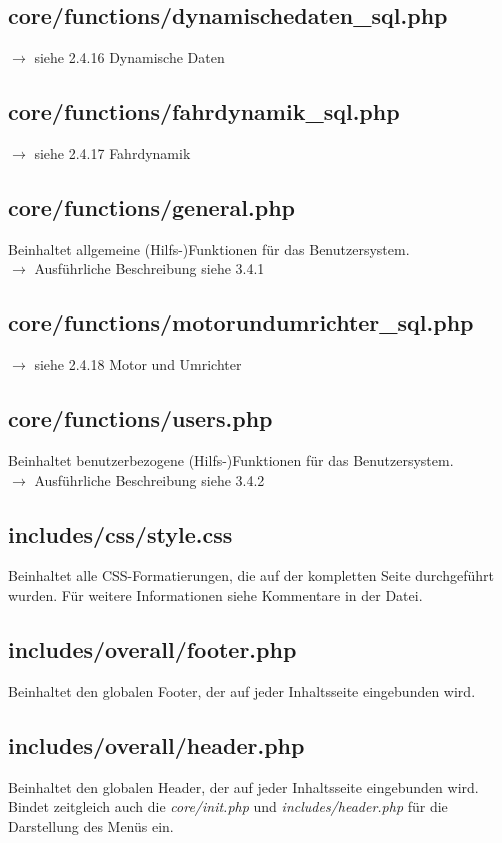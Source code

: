 \documentclass[fontsize = 12pt, paper = a4]{scrreprt}
\begin{document}
\subsection{core/functions/dynamischedaten\_sql.php}
$\rightarrow$ siehe 2.4.16 Dynamische Daten

\subsection{core/functions/fahrdynamik\_sql.php}
$\rightarrow$ siehe 2.4.17 Fahrdynamik

\subsection{core/functions/general.php}
Beinhaltet allgemeine (Hilfs-)Funktionen für das Benutzersystem.\\
$\rightarrow$ Ausführliche Beschreibung siehe 3.4.1

\subsection{core/functions/motorundumrichter\_sql.php}
$\rightarrow$ siehe 2.4.18 Motor und Umrichter

\subsection{core/functions/users.php}
Beinhaltet benutzerbezogene (Hilfs-)Funktionen für das Benutzersystem.\\
$\rightarrow$ Ausführliche Beschreibung siehe 3.4.2

\subsection{includes/css/style.css}
Beinhaltet alle CSS-Formatierungen, die auf der kompletten Seite durchgeführt wurden. Für weitere Informationen siehe Kommentare in der Datei.

\subsection{includes/overall/footer.php}
Beinhaltet den globalen Footer, der auf jeder Inhaltsseite eingebunden wird.

\subsection{includes/overall/header.php}
Beinhaltet den globalen Header, der auf jeder Inhaltsseite eingebunden wird. Bindet zeitgleich auch die \textit{core/init.php} und \textit{includes/header.php} für die Darstellung des Menüs ein.
\end{document}
